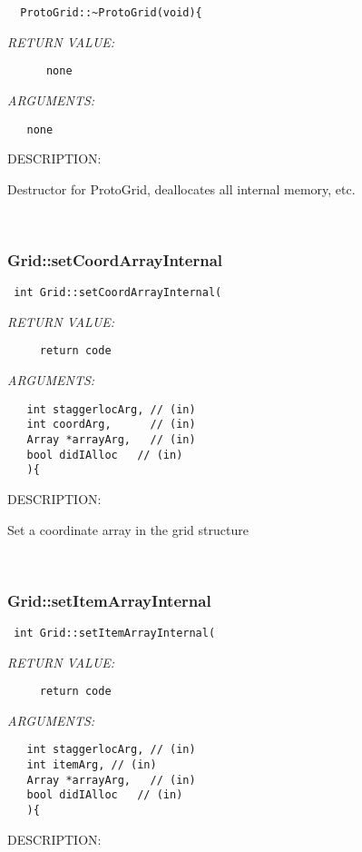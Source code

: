   
\begin{verbatim}  ProtoGrid::~ProtoGrid(void){\end{verbatim}{\em RETURN VALUE:}
\begin{verbatim}      none\end{verbatim}{\em ARGUMENTS:}
\begin{verbatim}   none\end{verbatim}
{\sf DESCRIPTION:\\ }


    Destructor for ProtoGrid, deallocates all internal memory, etc. 
   
 
\mbox{}\hrulefill\
 
\subsubsection [Grid::setCoordArrayInternal] {Grid::setCoordArrayInternal}


  
\begin{verbatim} int Grid::setCoordArrayInternal(\end{verbatim}{\em RETURN VALUE:}
\begin{verbatim}     return code\end{verbatim}{\em ARGUMENTS:}
\begin{verbatim}   int staggerlocArg, // (in)
   int coordArg,      // (in)
   Array *arrayArg,   // (in)
   bool didIAlloc   // (in)
   ){\end{verbatim}
{\sf DESCRIPTION:\\ }


     Set a coordinate array in the grid structure
   
 
\mbox{}\hrulefill\
 
\subsubsection [Grid::setItemArrayInternal] {Grid::setItemArrayInternal}


  
\begin{verbatim} int Grid::setItemArrayInternal(\end{verbatim}{\em RETURN VALUE:}
\begin{verbatim}     return code\end{verbatim}{\em ARGUMENTS:}
\begin{verbatim}   int staggerlocArg, // (in)
   int itemArg, // (in)
   Array *arrayArg,   // (in)
   bool didIAlloc   // (in)
   ){\end{verbatim}
{\sf DESCRIPTION:\\ }


